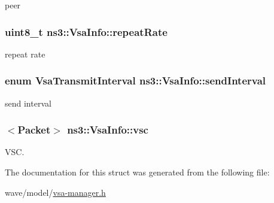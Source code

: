 peer 

\subsubsection[{\texorpdfstring{repeat\+Rate}{repeatRate}}]{\setlength{\rightskip}{0pt plus 5cm}uint8\+\_\+t ns3\+::\+Vsa\+Info\+::repeat\+Rate}\hypertarget{structns3_1_1VsaInfo_a816b5ae961ed99f295cf382216e3ea32}{}\label{structns3_1_1VsaInfo_a816b5ae961ed99f295cf382216e3ea32}


repeat rate 

\subsubsection[{\texorpdfstring{send\+Interval}{sendInterval}}]{\setlength{\rightskip}{0pt plus 5cm}enum {\bf Vsa\+Transmit\+Interval} ns3\+::\+Vsa\+Info\+::send\+Interval}\hypertarget{structns3_1_1VsaInfo_a75c7e3b19d0b496e882f55d6829085cb}{}\label{structns3_1_1VsaInfo_a75c7e3b19d0b496e882f55d6829085cb}


send interval 

\subsubsection[{\texorpdfstring{vsc}{vsc}}]{$<${\bf Packet}$>$ ns3\+::\+Vsa\+Info\+::vsc}\hypertarget{structns3_1_1VsaInfo_acbc9fabb7d77260ca285ab61f2999825}{}\label{structns3_1_1VsaInfo_acbc9fabb7d77260ca285ab61f2999825}


V\+SC. 



The documentation for this struct was generated from the following file\+:\begin{DoxyCompactItemize}
\item 
wave/model/\hyperlink{vsa-manager_8h}{vsa-\/manager.\+h}\end{DoxyCompactItemize}
